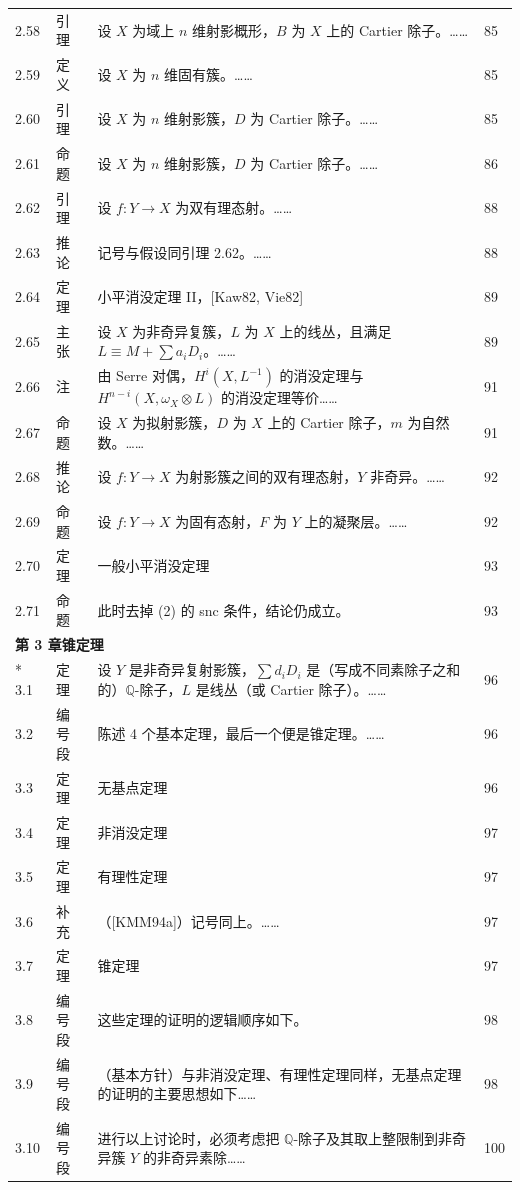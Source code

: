 \begin{longtable}{@{}p{}p{}p{}p{}@{}}
2.58 & 引理 & 设 $X$ 为域上 $n$ 维射影概形，$B$ 为 $X$ 上的 Cartier 除子。…… & 85 \\
2.59 & 定义 & 设 $X$ 为 $n$ 维固有簇。…… & 85 \\
2.60 & 引理 & 设 $X$ 为 $n$ 维射影簇，$D$ 为 Cartier 除子。…… & 85 \\
2.61 & 命题 & 设 $X$ 为 $n$ 维射影簇，$D$ 为 Cartier 除子。…… & 86 \\
2.62 & 引理 & 设 $f:Y\to X$ 为双有理态射。…… & 88 \\
2.63 & 推论 & 记号与假设同引理 2.62。…… & 88 \\
2.64 & 定理 & 小平消没定理 II，{[Kaw82, Vie82]} & 89 \\
2.65 & 主张 & 设 $X$ 为非奇异复簇，$L$ 为 $X$ 上的线丛，且满足 $L\equiv M+\sum a_iD_i$。…… & 89 \\
2.66 & 注 & 由 Serre 对偶，$H^i(X,L^{-1})$ 的消没定理与 $H^{n-i}(X,\omega_X\otimes L)$ 的消没定理等价…… & 91 \\
2.67 & 命题 & 设 $X$ 为拟射影簇，$D$ 为 $X$ 上的 Cartier 除子，$m$ 为自然数。…… & 91 \\
2.68 & 推论 & 设 $f:Y\to X$ 为射影簇之间的双有理态射，$Y$ 非奇异。…… & 92 \\
2.69 & 命题 & 设 $f:Y\to X$ 为固有态射，$F$ 为 $Y$ 上的凝聚层。…… & 92 \\
2.70 & 定理 & 一般小平消没定理 & 93 \\
2.71 & 命题 & 此时去掉 (2) 的 snc 条件，结论仍成立。 & 93 \\
\multicolumn{4}{l}{\textbf{第 3 章\quad 锥定理}}\\*
3.1 & 定理 & 设 $Y$ 是非奇异复射影簇，$\sum d_iD_i$ 是（写成不同素除子之和的）$\mathbb{Q}$-除子，$L$ 是线丛（或 Cartier 除子）。…… & 96 \\
3.2 & 编号段 & 陈述 4 个基本定理，最后一个便是锥定理。…… & 96 \\
3.3 & 定理 & 无基点定理 & 96 \\
3.4 & 定理 & 非消没定理 & 97 \\
3.5 & 定理 & 有理性定理 & 97 \\
3.6 & 补充 & （[KMM94a]）\quad 记号同上。…… & 97 \\
3.7 & 定理 & 锥定理 & 97 \\
3.8 & 编号段 & 这些定理的证明的逻辑顺序如下。 & 98 \\
3.9 & 编号段 & （基本方针）\quad 与非消没定理、有理性定理同样，无基点定理的证明的主要思想如下…… & 98 \\
3.10 & 编号段 & 进行以上讨论时，必须考虑把 $\mathbb{Q}$-除子及其取上整限制到非奇异簇 $Y$ 的非奇异素除…… & 100 \\

\end{longtable}
